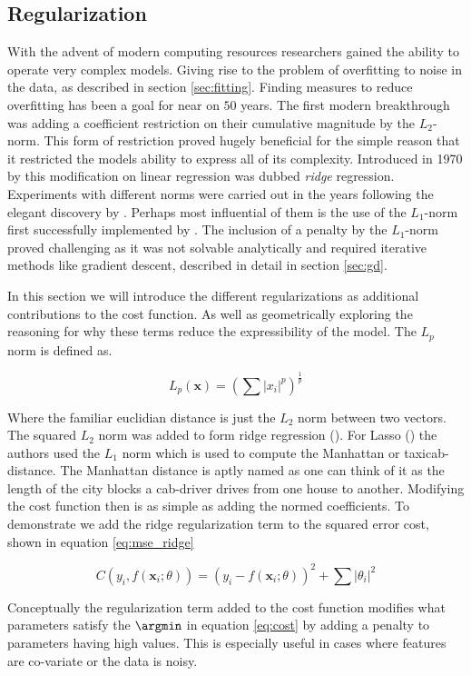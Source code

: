 \subsection{Regularization}

With the advent of modern computing resources researchers gained the ability to operate very complex models. Giving rise to the problem of overfitting to noise in the data, as described in section \ref{sec:fitting}. Finding measures to reduce overfitting has been a goal for near on $50$ years. The first modern breakthrough was adding a coefficient restriction on their cumulative magnitude by the $L_2$-norm. This form of restriction proved hugely beneficial for the simple reason that it restricted the models ability to express all of its complexity. Introduced in 1970 by \citet{Hoerl1970} this modification on linear regression was dubbed \textit{ridge} regression. Experiments with different norms were carried out in the years following the elegant discovery by \cite{Hoerl1970}. Perhaps most influential of them is the use of the $L_1$-norm first successfully implemented by \citet{Tibshirani1996}. The inclusion of a penalty by the $L_1$-norm proved challenging as it was not solvable analytically and required iterative methods like gradient descent, described in detail in section \ref{sec:gd}. 

In this section we will introduce the different regularizations as additional contributions to the cost function. As well as geometrically exploring the reasoning for why these terms reduce the expressibility of the model. The $L_p$ norm is defined as. 

\begin{equation}
L_p(\mathbf{x}) = \left(\sum |x_i|^p\right)^{\frac{1}{p}}
\end{equation}

\noindent Where the familiar euclidian distance is just the $L_2$ norm between two vectors. The squared $L_2$ norm was added to form ridge regression (\cite{Hoerl1970}). For Lasso (\cite{Tibshirani1996}) the authors used the $L_1$ norm which is used to compute the Manhattan or taxicab-distance. The Manhattan distance is aptly named as one can think of it as the length of the city blocks a cab-driver drives from one house to another. Modifying the cost function then is as simple as adding the normed coefficients. To demonstrate we add the ridge regularization term to the squared error cost, shown in equation \ref{eq:mse_ridge}

\begin{equation}\label{eq:mse_ridge}
C(y_i, f(\mathbf{x}_i; \theta)) = (y_i - f(\mathbf{x}_i; \theta))^2 + \sum|\theta_i|^2
\end{equation}

\noindent Conceptually the regularization term added to the cost function modifies what parameters satisfy the $\argmin$ in equation \ref{eq:cost} by adding a penalty to parameters having high values. This is especially useful in cases where features are co-variate or the data is noisy. 